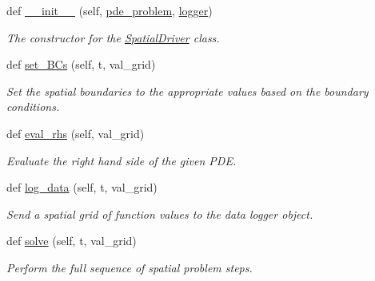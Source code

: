 \begin{DoxyCompactItemize}
\item 
def \hyperlink{classMain__PDE__Repo_1_1src_1_1spatial__driver_1_1SpatialDriver_a6661666d68acd2e1cbaeed8fbd30aa8c}{\+\_\+\+\_\+init\+\_\+\+\_\+} (self, \hyperlink{classMain__PDE__Repo_1_1src_1_1spatial__driver_1_1SpatialDriver_a2a61190d268b74c9388d3bbe3e3cce93}{pde\+\_\+problem}, \hyperlink{classMain__PDE__Repo_1_1src_1_1spatial__driver_1_1SpatialDriver_aac2299eb18270b9cc3c17d2d07e0dc57}{logger})
\begin{DoxyCompactList}\small\item\em The constructor for the \hyperlink{classMain__PDE__Repo_1_1src_1_1spatial__driver_1_1SpatialDriver}{Spatial\+Driver} class. \end{DoxyCompactList}\item 
def \hyperlink{classMain__PDE__Repo_1_1src_1_1spatial__driver_1_1SpatialDriver_a8383df7f86b0bca04a6787290438cde7}{set\+\_\+\+B\+Cs} (self, t, val\+\_\+grid)
\begin{DoxyCompactList}\small\item\em Set the spatial boundaries to the appropriate values based on the boundary conditions. \end{DoxyCompactList}\item 
def \hyperlink{classMain__PDE__Repo_1_1src_1_1spatial__driver_1_1SpatialDriver_afcf6ad549e5939c1eb267144b26d2042}{eval\+\_\+rhs} (self, val\+\_\+grid)
\begin{DoxyCompactList}\small\item\em Evaluate the right hand side of the given P\+DE. \end{DoxyCompactList}\item 
def \hyperlink{classMain__PDE__Repo_1_1src_1_1spatial__driver_1_1SpatialDriver_ace8ab1e2e0d8e9da601ecddf44d504c2}{log\+\_\+data} (self, t, val\+\_\+grid)
\begin{DoxyCompactList}\small\item\em Send a spatial grid of function values to the data logger object. \end{DoxyCompactList}\item 
def \hyperlink{classMain__PDE__Repo_1_1src_1_1spatial__driver_1_1SpatialDriver_ada0ed39211b437d2f86b9b103a690eb3}{solve} (self, t, val\+\_\+grid)
\begin{DoxyCompactList}\small\item\em Perform the full sequence of spatial problem steps. \end{DoxyCompactList}\end{DoxyCompactItemize}
